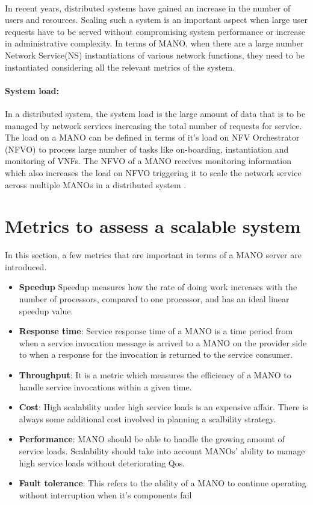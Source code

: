 \paragraph{}
In recent years, distributed systems have gained an increase in the number of users and resources. Scaling such a system is an important aspect when large user requests have to be served without compromising system performance or increase in administrative complexity. In terms of MANO, when there are a large number Network Service(NS) instantiations of various network functions, they need to be instantiated considering all the relevant metrics of the system.

\paragraph{System load:}
In a distributed system, the system load is the large amount of data that is to be managed by network services increasing the total number of requests for service.
The load on a MANO can be defined in terms of it's load on NFV Orchestrator (NFVO) to process large number of tasks like on-boarding, instantiation and monitoring of VNFs. The NFVO of a MANO receives monitoring information which also increases the load on NFVO triggering it to scale the network service across multiple MANOs in a distributed system \cite{soenen2017optimising}.


\section{Metrics to assess a scalable system}
\label{Metrics}
In this section, a few metrics that are important in terms of a MANO server are introduced.

\begin{itemize}
	\item \textbf{Speedup} Speedup measures how the  rate of doing work increases with the number of processors, compared to one processor, and has an ideal linear speedup value. \cite{jogalekar_evaluating_2000}
	\item  \textbf{Response time}: Service response time of a MANO is a time period from when a service invocation message is arrived to a MANO on the provider side to when a response for the invocation is returned to the service consumer.
	\item \textbf {Throughput}: It is a metric which measures the efficiency of a MANO to handle service invocations within a given time.
	\item \textbf{Cost}: High scalability under high service loads is an expensive affair. There is always some additional cost involved in planning a scalbility strategy.
	\item \textbf{Performance}: MANO should be able to handle the growing amount of service loads. Scalability should take into account MANOs' ability to manage high service loads without deteriorating Qos.
	\item \textbf{Fault tolerance}: This refers to the ability of a MANO to continue operating without interruption when it's components fail
\end{itemize}